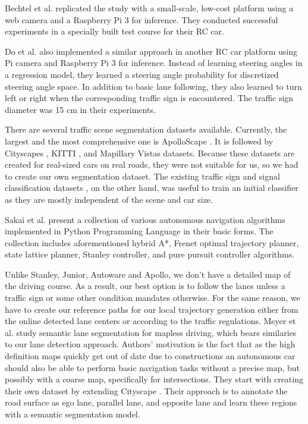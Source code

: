 Bechtel et al. \cite{Bechtel2017DeepPicarAL} replicated the study
\cite{Bojarski2016EndTE} with a small-scale, low-cost platform using a web
camera and a Raspberry Pi 3 for inference. They conducted successful
experiments in a specially built test course for their RC car.

Do et al. \cite{Do2018RealTimeSC} also implemented a similar approach in
another RC car platform using Pi camera and Raspberry Pi 3 for inference.
Instead of learning steering angles in a regression model, they learned a
steering angle probability for discretized steering angle space. In addition to
basic lane following, they also learned to turn left or right when the
corresponding traffic sign is encountered. The traffic sign diameter was 15 cm
in their experiments.

There are several traffic scene segmentation datasets available. Currently,
the largest and the most comprehensive one is ApolloScape
\cite{Huang2018TheAD}. It is followed by Cityscapes \cite{Cordts2016TheCD},
KITTI \cite{Geiger2012AreWR}, and Mapillary Vistas \cite{Neuhold2017TheMV}
datasets. Because these datasets are created for real-sized cars on real roads,
they were not suitable for us, so we had to create our own segmentation
dataset. The existing traffic sign and signal classification datasets
\cite{Timofte2009MultiviewTS, Stallkamp2012ManVC, Shakhuro2016RussianTS,
Serna2018ClassificationOT, MaldonadoBascn2007RoadSignDA}, on the other hand,
was useful to train an initial classifier as they are mostly independent of the
scene and car size.

Sakai et al. \cite{Kim2013SensorbasedMP} present a collection of various
autonomous navigation algorithms implemented in Python Programming Language in
their basic forms. The collection includes aforementioned hybrid A*, Frenet
optimal trajectory planner, state lattice planner, Stanley controller, and pure
pursuit controller algorithms.

Unlike Stanley, Junior, Autoware and Apollo, we don't have a detailed map of
the driving course. As a result, our best option is to follow the lanes unless
a traffic sign or some other condition mandates otherwise. For the same reason,
we have to create our reference paths for our local trajectory generation
either from the online detected lane centers or according to the traffic
regulations. Meyer et al. \cite{Meyer2018DeepSL} study semantic lane
segmentation for mapless driving, which bears similaries to our lane detection
approach. Authors' motivation is the fact that as the high definition maps
quickly get out of date due to constructions an autonomous car should also be
able to perform basic navigation tasks without a precise map, but possibly with
a coarse map, specifically for intersections. They start with creating their
own dataset by extending Cityscape \cite{Cordts2016TheCD}. Their approach is to
annotate the road surface as ego lane, parallel lane, and opposite lane and
learn these regions with a semantic segmentation model.


